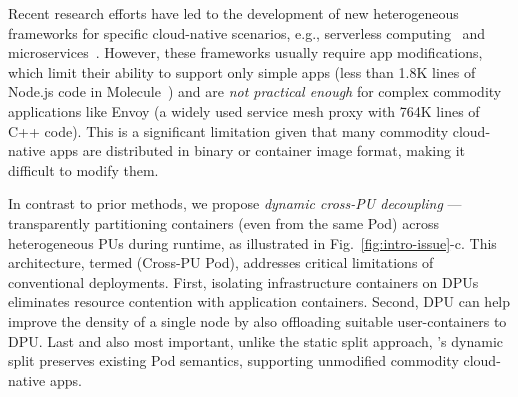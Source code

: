 Recent research efforts have led to the development of new heterogeneous frameworks for specific cloud-native scenarios, e.g., serverless computing~\cite{10.1145/3503222.3507732} and microservices~\cite{234944}.
However, these frameworks usually require app modifications, which limit their ability to support only simple apps (less than 1.8K lines of Node.js code in Molecule~\cite{10.1145/3503222.3507732}) and are \emph{not practical enough} for complex commodity applications like Envoy (a widely used service mesh proxy with 764K lines of C++ code).
This is a significant limitation given that many commodity cloud-native apps are distributed in binary or container image format, making it difficult to modify them.


In contrast to prior methods, %
we propose \emph{dynamic cross-PU decoupling} --- transparently partitioning containers (even from the same Pod) across heterogeneous PUs during runtime,
as illustrated in Fig.~\ref{fig:intro-issue}-c. This architecture, termed \xpod (Cross-PU Pod), addresses critical limitations of conventional deployments.
First, isolating infrastructure containers on DPUs eliminates resource contention with application containers.
Second, DPU can help improve the density of a single node by also offloading suitable user-containers to DPU.
Last and also most important, unlike the static split approach, \xpod's dynamic split preserves existing Pod semantics, supporting unmodified commodity cloud-native apps.

